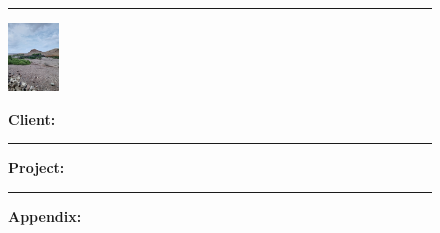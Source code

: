 \documentclass[12pt, letterpaper]{article}
\begin{document}
\begin{figure}[h]
{{\begin{minipage}[c][3.5cm][t]{0.4\textwidth}
\begin{minipage}[t][1.5cm][t]{0.4\textwidth}
                            \end{minipage}
                            \hrule
                                    \begin{minipage}[c][2cm][c]{\textwidth} %
                                \centering
                                        \includegraphics[height=1.8cm]{photos/1.png}
                                    \end{minipage}
                            \end{minipage}%
                            \vline %
                            \begin{minipage}[c][3cm][t]{0.6\textwidth} %
                                \begin{minipage}[c][1cm][t]{0.8\textwidth} %
                                \vspace{2mm}     
                                \hspace{2mm}
                                    \raggedright
                                \textbf{\small{Client: } \footnotesize{}} 
                                \end{minipage}
                                \hrule %
                                \begin{minipage}[c][1.4cm][t]{0.9\textwidth} %
                                    \vspace{2mm}
                                    \hspace*{2mm}
                                    \raggedright
                                    \parbox[t]{\linewidth}{\textbf{\small{Project:}} {\hangindent=2mm }}
                                \end{minipage}
                                \hrule %
                                \begin{minipage}[c][0.6cm][t]{0.8\textwidth} %
                                \vspace{2mm}
                                \hspace{2mm}
                                    \raggedright
                                \textbf{\footnotesize Appendix: } 
                                \end{minipage}
                            \end{minipage}
                        
                }}
        \end{figure}
        \clearpage
        
\end{document}
